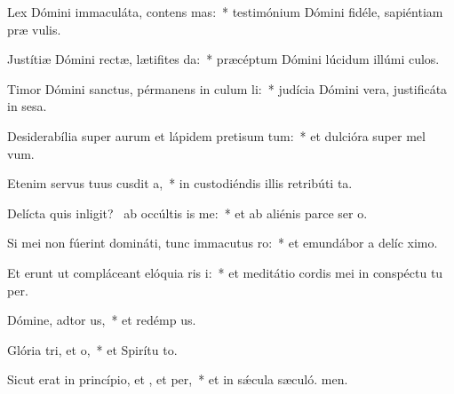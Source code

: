 \item Lex Dómini immaculáta, contens mas:~* testimónium Dómini fidéle, sapiéntiam præ vulis.
\item Justítiæ Dómini rectæ, lætifites da:~* præcéptum Dómini lúcidum illúmi culos.
\item Timor Dómini sanctus, pérmanens in culum li:~* judícia Dómini vera, justificáta in sesa.
\item Desiderabília super aurum et lápidem pretisum tum:~* et dulcióra super mel  vum.
\item Etenim servus tuus cusdit a,~* in custodiéndis illis retribúti ta.
\item Delícta quis inligit?~\pscross{} ab occúltis is  me:~* et ab aliénis parce ser o.
\item Si mei non fúerint domináti, tunc immacutus ro:~* et emundábor a delíc ximo.
\item Et erunt ut compláceant elóquia ris i:~* et meditátio cordis mei in conspéctu tu per.
\item Dómine, adtor us,~* et redémp us.
\item Glória tri, et o,~* et Spirítu to.
\item Sicut erat in princípio, et , et per,~* et in sǽcula sæculó. men.
